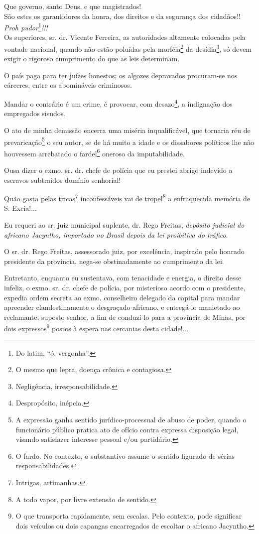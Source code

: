Que governo, santo Deus, e que magistrados!\\
São estes os garantidores da honra, dos direitos e da segurança dos
cidadãos!!\\
\emph{Proh pudor}\footnote{Do latim, ``ó, vergonha''.}\emph{!!!}\\
Os superiores, sr. dr. Vicente Ferreira, as autoridades altamente
colocadas pela vontade nacional, quando não estão poluídas pela
morféia\footnote{O mesmo que lepra, doença crônica e contagiosa.} da
desídia\footnote{Negligência, irresponsabilidade.}, só devem exigir o
rigoroso cumprimento do que as leis determinam.

O país paga para ter juízes honestos; os algozes depravados procuram-se
nos cárceres, entre os abomináveis criminosos.

Mandar o contrário é um crime, é provocar, com desazo\footnote{
  Despropósito, inépcia.}, a indignação dos empregados sisudos.

O ato de minha demissão encerra uma miséria inqualificável, que tornaria
réu de prevaricação\footnote{A expressão ganha sentido
  jurídico-processual de abuso de poder, quando o funcionário público
  pratica ato de ofício contra expressa disposição legal, visando
  satisfazer interesse pessoal e/ou partidário.} o seu autor, se de há
muito a idade e os dissabores políticos lhe não houvessem arrebatado o
fardel\footnote{O fardo. No contexto, o substantivo assume o sentido
  figurado de sérias responsabilidades.} oneroso da imputabilidade.

Ousa dizer o exmo. sr. dr. chefe de polícia que eu prestei abrigo
indevido a escravos subtraídos domínio senhorial!

Quão gasta pelas tricas\footnote{Intrigas, artimanhas.} inconfessáveis
vai de tropel\footnote{A todo vapor, por livre extensão de sentido.} a
enfraquecida memória de S. Excia!...

Eu requeri ao sr. juiz municipal suplente, dr. Rego Freitas,
\emph{depósito judicial do africano Jacyntho, importado no Brasil depois
da lei proibitiva do tráfico}.

O sr. dr. Rego Freitas, assessorado juiz, por excelência, inspirado pelo
honrado presidente da província, nega-se obstinadamente ao cumprimento
da lei.

Entretanto, enquanto eu sustentava, com tenacidade e energia, o direito
desse infeliz, o exmo. sr. dr. chefe de polícia, por misterioso acordo
com o presidente, expedia ordem secreta ao exmo. conselheiro delegado da
capital para mandar apreender clandestinamente o desgraçado africano, e
entregá-lo manietado ao reclamante, suposto senhor, a fim de conduzi-lo
para a província de Minas, por dois expressos\footnote{O que
  transporta rapidamente, sem escalas. Pelo contexto, pode significar
  dois veículos ou dois capangas encarregados de escoltar o africano
  Jacyntho.} postos à espera nas cercanias desta cidade!...


